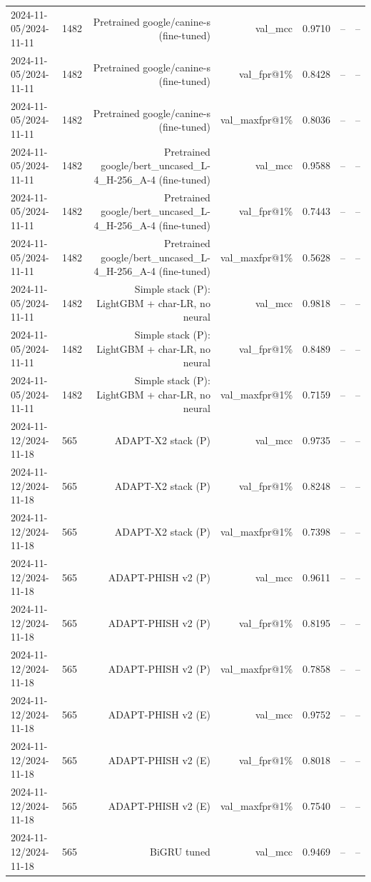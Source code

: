 \begin{table}[t]
\begin{tabular}{llrrrrr}
2024-11-05/2024-11-11 & 1482 & Pretrained google/canine-s (fine-tuned) & val\_mcc & 0.9710 & -- & -- \\
2024-11-05/2024-11-11 & 1482 & Pretrained google/canine-s (fine-tuned) & val\_fpr@1\% & 0.8428 & -- & -- \\
2024-11-05/2024-11-11 & 1482 & Pretrained google/canine-s (fine-tuned) & val\_maxfpr@1\% & 0.8036 & -- & -- \\
2024-11-05/2024-11-11 & 1482 & Pretrained google/bert\_uncased\_L-4\_H-256\_A-4 (fine-tuned) & val\_mcc & 0.9588 & -- & -- \\
2024-11-05/2024-11-11 & 1482 & Pretrained google/bert\_uncased\_L-4\_H-256\_A-4 (fine-tuned) & val\_fpr@1\% & 0.7443 & -- & -- \\
2024-11-05/2024-11-11 & 1482 & Pretrained google/bert\_uncased\_L-4\_H-256\_A-4 (fine-tuned) & val\_maxfpr@1\% & 0.5628 & -- & -- \\
2024-11-05/2024-11-11 & 1482 & Simple stack (P): LightGBM + char-LR, no neural & val\_mcc & 0.9818 & -- & -- \\
2024-11-05/2024-11-11 & 1482 & Simple stack (P): LightGBM + char-LR, no neural & val\_fpr@1\% & 0.8489 & -- & -- \\
2024-11-05/2024-11-11 & 1482 & Simple stack (P): LightGBM + char-LR, no neural & val\_maxfpr@1\% & 0.7159 & -- & -- \\
2024-11-12/2024-11-18 & 565 & ADAPT-X2 stack (P) & val\_mcc & 0.9735 & -- & -- \\
2024-11-12/2024-11-18 & 565 & ADAPT-X2 stack (P) & val\_fpr@1\% & 0.8248 & -- & -- \\
2024-11-12/2024-11-18 & 565 & ADAPT-X2 stack (P) & val\_maxfpr@1\% & 0.7398 & -- & -- \\
2024-11-12/2024-11-18 & 565 & ADAPT-PHISH v2 (P) & val\_mcc & 0.9611 & -- & -- \\
2024-11-12/2024-11-18 & 565 & ADAPT-PHISH v2 (P) & val\_fpr@1\% & 0.8195 & -- & -- \\
2024-11-12/2024-11-18 & 565 & ADAPT-PHISH v2 (P) & val\_maxfpr@1\% & 0.7858 & -- & -- \\
2024-11-12/2024-11-18 & 565 & ADAPT-PHISH v2 (E) & val\_mcc & 0.9752 & -- & -- \\
2024-11-12/2024-11-18 & 565 & ADAPT-PHISH v2 (E) & val\_fpr@1\% & 0.8018 & -- & -- \\
2024-11-12/2024-11-18 & 565 & ADAPT-PHISH v2 (E) & val\_maxfpr@1\% & 0.7540 & -- & -- \\
2024-11-12/2024-11-18 & 565 & BiGRU tuned & val\_mcc & 0.9469 & -- & -- \\

\end{tabular}
\end{table}
